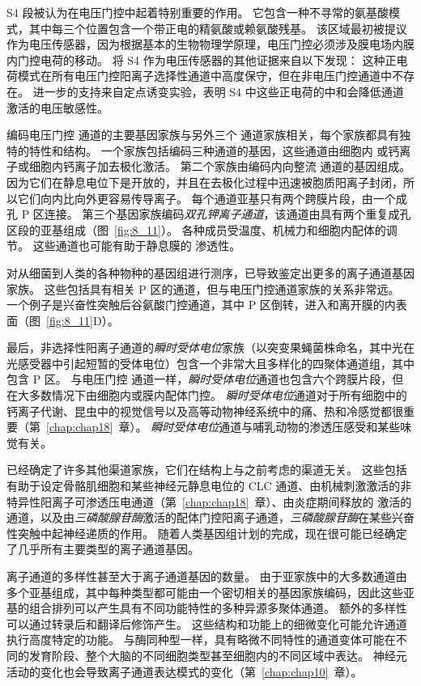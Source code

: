 S4 段被认为在电压门控中起着特别重要的作用。
它包含一种不寻常的氨基酸模式，其中每三个位置包含一个带正电的精氨酸或赖氨酸残基。
该区域最初被提议作为电压传感器，因为根据基本的生物物理学原理，电压门控必须涉及膜电场内膜内门控电荷的移动。
将 S4 作为电压传感器的其他证据来自以下发现：
这种正电荷模式在所有电压门控阳离子选择性通道中高度保守，但在非电压门控通道中不存在。
进一步的支持来自定点诱变实验，表明 S4 中这些正电荷的中和会降低通道激活的电压敏感性。


编码电压门控  通道的主要基因家族与另外三个  通道家族相关，每个家族都具有独特的特性和结构。
一个家族包括编码三种通道的基因，这些通道由细胞内  或钙离子或细胞内钙离子加去极化激活。
第二个家族由编码内向整流  通道的基因组成。
因为它们在静息电位下是开放的，并且在去极化过程中迅速被胞质阳离子封闭，所以它们向内比向外更容易传导离子。
每个通道亚基只有两个跨膜片段，由一个成孔 P 区连接。
第三个基因家族编码\textit{双孔钾离子通道}，该通道由具有两个重复成孔区段的亚基组成（图~\ref{fig:8_11}）。
各种成员受温度、机械力和细胞内配体的调节。
这些通道也可能有助于静息膜的  渗透性。


对从细菌到人类的各种物种的基因组进行测序，已导致鉴定出更多的离子通道基因家族。
这些包括具有相关 P 区的通道，但与电压门控通道家族的关系非常远。
一个例子是兴奋性突触后谷氨酸门控通道，其中 P 区倒转，进入和离开膜的内表面（图~\ref{fig:8_11}D）。


最后，非选择性阳离子通道的\textit{瞬时受体电位}家族（以突变果蝇菌株命名，其中光在光感受器中引起短暂的受体电位）包含一个非常大且多样化的四聚体通道组，其中包含 P 区。
与电压门控  通道一样，\textit{瞬时受体电位}通道也包含六个跨膜片段，但在大多数情况下由细胞内或膜内配体门控。
\textit{瞬时受体电位}通道对于所有细胞中的钙离子代谢、昆虫中的视觉信号以及高等动物神经系统中的痛、热和冷感觉都很重要（第~\ref{chap:chap18}~章）。
\textit{瞬时受体电位}通道与哺乳动物的渗透压感受和某些味觉有关。


已经确定了许多其他渠道家族，它们在结构上与之前考虑的渠道无关。
这些包括有助于设定骨骼肌细胞和某些神经元静息电位的 CLC  通道、由机械刺激激活的非特异性阳离子可渗透压电通道（第~\ref{chap:chap18}~章）、由炎症期间释放的  激活的  通道，以及由\textit{三磷酸腺苷酶}激活的配体门控阳离子通道，\textit{三磷酸腺苷酶}在某些兴奋性突触中起神经递质的作用。
随着人类基因组计划的完成，现在很可能已经确定了几乎所有主要类型的离子通道基因。


离子通道的多样性甚至大于离子通道基因的数量。
由于亚家族中的大多数通道由多个亚基组成，其中每种类型都可能由一个密切相关的基因家族编码，因此这些亚基的组合排列可以产生具有不同功能特性的多种异源多聚体通道。
额外的多样性可以通过转录后和翻译后修饰产生。
这些结构和功能上的细微变化可能允许通道执行高度特定的功能。
与酶同种型一样，具有略微不同特性的通道变体可能在不同的发育阶段、整个大脑的不同细胞类型甚至细胞内的不同区域中表达。
神经元活动的变化也会导致离子通道表达模式的变化（第~\ref{chap:chap10}~章）。


